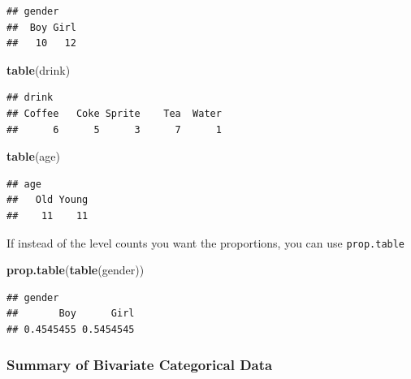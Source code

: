 \documentclass[]{book}
\newenvironment{Shaded}{\begin{snugshade}}{\end{snugshade}}
\newcommand{\KeywordTok}[1]{\textcolor[rgb]{0.13,0.29,0.53}{\textbf{#1}}}
\newcommand{\StringTok}[1]{\textcolor[rgb]{0.31,0.60,0.02}{#1}}
\newcommand{\CommentTok}[1]{\textcolor[rgb]{0.56,0.35,0.01}{\textit{#1}}}
\newcommand{\OperatorTok}[1]{\textcolor[rgb]{0.81,0.36,0.00}{\textbf{#1}}}
\newcommand{\NormalTok}[1]{#1}
\theoremstyle{definition}
\theoremstyle{definition}
\theoremstyle{definition}
\theoremstyle{remark}
\begin{document}
\begin{verbatim}
## gender
##  Boy Girl 
##   10   12
\end{verbatim}

\begin{Shaded}
\begin{Highlighting}[]
\KeywordTok{table}\NormalTok{(drink)}
\end{Highlighting}
\end{Shaded}

\begin{verbatim}
## drink
## Coffee   Coke Sprite    Tea  Water 
##      6      5      3      7      1
\end{verbatim}

\begin{Shaded}
\begin{Highlighting}[]
\KeywordTok{table}\NormalTok{(age)}
\end{Highlighting}
\end{Shaded}

\begin{verbatim}
## age
##   Old Young 
##    11    11
\end{verbatim}

If instead of the level counts you want the proportions, you can use
\texttt{prop.table}

\begin{Shaded}
\begin{Highlighting}[]
\KeywordTok{prop.table}\NormalTok{(}\KeywordTok{table}\NormalTok{(gender))}
\end{Highlighting}
\end{Shaded}

\begin{verbatim}
## gender
##       Boy      Girl 
## 0.4545455 0.5454545
\end{verbatim}

\subsubsection{Summary of Bivariate Categorical
Data}\label{summary-of-bivariate-categorical-data}

\begin{Shaded}
\end{Shaded}
\end{document}
